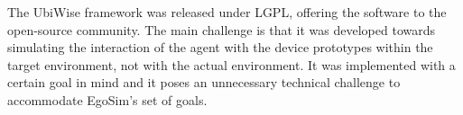 The UbiWise framework was released under LGPL\cite{lgpl}, offering the software to the open-source community. The main challenge is that it was developed towards simulating the interaction of the agent with the device prototypes within the target environment, not with the actual environment. It was implemented with a certain goal in mind and it poses an unnecessary technical challenge to accommodate EgoSim's set of goals.\\
